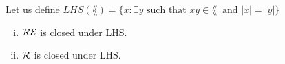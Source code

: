 Let us define $LHS(\lang) = \{x : \exists y \text{ such that } xy \in \lang\ \text{ and } |x| = |y|\}$

\begin{enumerate}[i.]
    \item $\mathcal{R}\mathcal{E}$ is closed under LHS.


    \item $\mathcal{R}$ is closed under LHS.


\end{enumerate}